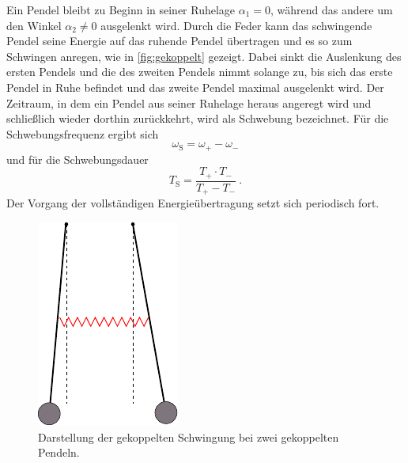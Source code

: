     Ein Pendel bleibt zu Beginn in seiner Ruhelage $\alpha_1 = 0$,
    während das andere um den Winkel $\alpha_2 \neq 0$ ausgelenkt wird.
    Durch die Feder kann das schwingende Pendel seine Energie auf das ruhende Pendel übertragen und es so zum Schwingen anregen,
    wie in \autoref{fig:gekoppelt} gezeigt.
    Dabei sinkt die Auslenkung des ersten Pendels und die des zweiten Pendels nimmt solange zu,
    bis sich das erste Pendel in Ruhe befindet und das zweite Pendel maximal ausgelenkt wird.
    Der Zeitraum,
    in dem ein Pendel aus seiner Ruhelage heraus angeregt wird und schließlich wieder dorthin zurückkehrt,
    wird als Schwebung bezeichnet.
    Für die Schwebungsfrequenz ergibt sich
    \begin{equation}
        \label{eqn:frequenz_schwebung}
        \omega_\text{S} = \omega_+ - \omega_-
    \end{equation}
    und für die Schwebungsdauer
    \begin{equation}
        \label{eqn:dauer_schwebung}
        T_\text{S} = \frac{T_+ \cdot T_-}{T_+ - T_-} \ .
%
    \end{equation}
    Der Vorgang der vollständigen Energieübertragung setzt sich periodisch fort.
    \begin{figure}
        \centering
            \includegraphics[scale=0.9]{content/img/Abb_3.pdf}
            \caption{Darstellung der gekoppelten Schwingung bei zwei gekoppelten Pendeln. \cite{versuchsanleitung}}
            \label{fig:gekoppelt}
    \end{figure}
